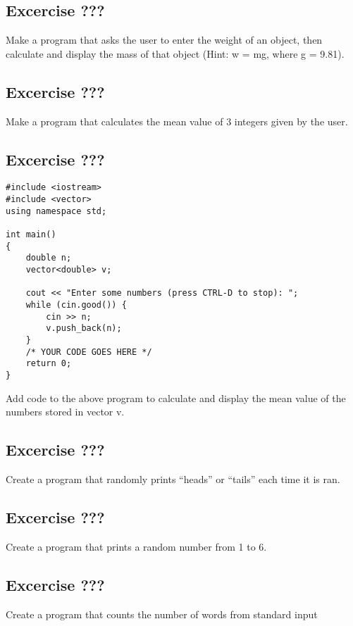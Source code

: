 \documentclass[a4paper,12pt]{article}
\begin{document}
\subsection*{Excercise ???}

Make a program that asks the user to enter the weight of an object, then calculate and display the mass of that object (Hint: w = mg, where g = 9.81).

\subsection*{Excercise ???}

Make a program that calculates the mean value of 3 integers given by the user.

\subsection*{Excercise ???}

\begin{lstlisting}[caption=avg.cpp]
#include <iostream>
#include <vector>
using namespace std;

int main()
{
	double n;
	vector<double> v;

	cout << "Enter some numbers (press CTRL-D to stop): ";
	while (cin.good()) {
		cin >> n;
		v.push_back(n);
	}
	/* YOUR CODE GOES HERE */
	return 0;
}
\end{lstlisting}

Add code to the above program to calculate and display the mean value of the numbers stored in vector v.

\subsection*{Excercise ???}

Create a program that randomly prints ``heads'' or ``tails'' each time it is ran.

\subsection*{Excercise ???}

Create a program that prints a random number from 1 to 6.

\subsection*{Excercise ???}

Create a program that counts the number of words from standard input
\end{document}
